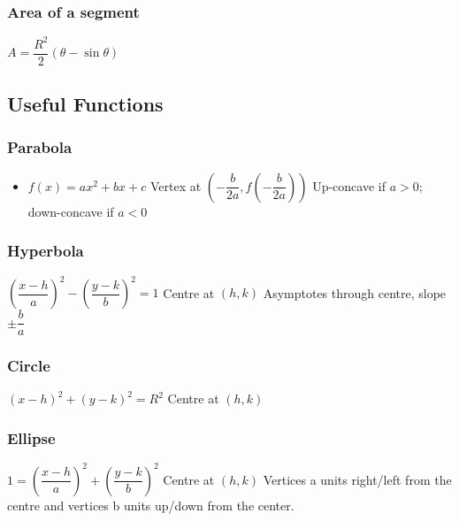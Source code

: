 \subsubsection{Area of a segment}
\begin{itemize}
\itemt \( A = \dfrac{R^2}{2} (\theta - \sin\theta) \)
\end{itemize}

		
        \subsection{Useful Functions}
        
\subsubsection{Parabola}
\begin{itemize}
\itemt \( f(x) = a(x-h)^2 + k \)
\itemt Vertex at \( (h,k) \)
\itemt Up-concave if $a>0$; down-concave if $a<0$
\item[]
\itemt \( f(x) = ax^2 + bx + c \)
\itemt Vertex at \( (-\dfrac{b}{2a}, f(-\dfrac{b}{2a})) \)
\itemt Up-concave if $a>0$; down-concave if $a<0$
\end{itemize}

\subsubsection{Hyperbola}
\begin{itemize}
\itemt \( (\dfrac{x-h}{a})^2 - (\dfrac{y-k}{b})^2 = 1\)
\itemt Centre at $(h,k)$
\itemt Asymptotes through centre, slope $\pm\dfrac{b}{a}$
\end{itemize}

\subsubsection{Circle}
\begin{itemize}
\itemt \( (x-h)^2 + (y-k)^2 = R^2\)
\itemt Centre at $(h,k)$
\end{itemize}

\subsubsection{Ellipse}
\begin{itemize}
\itemt \(1 = (\dfrac{x-h}{a})^2 + (\dfrac{y-k}{b})^2\)
\itemt Centre at $(h,k)$
\itemt Vertices a units right/left from the centre and vertices b units up/down from the center.
\end{itemize}	

